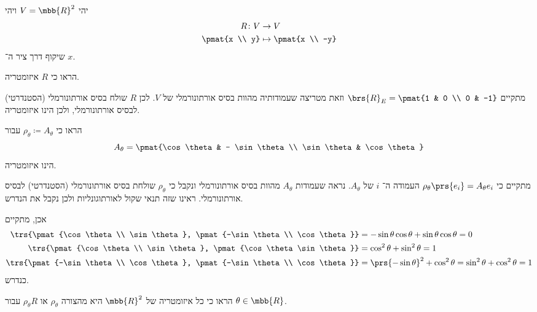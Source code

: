 \documentclass[a4paper,10pt,twoside,openany]{book}
\begin{document}
\begin{exercisechap}
יהי
$V = \mbb{R}^2$
ויהי
\begin{align*}
    R \colon V &\to V \\
    \pmat{x \\ y} &\mapsto \pmat{x \\ -y}
\end{align*}
שיקוף דרך ציר ה־%
$x$.

הראו כי
$R$
איזומטריה.
\end{exercisechap}

\begin{solution}
מתקיים
$\brs{R}_E = \pmat{1 & 0 \\ 0 & -1}$
וזאת מטריצה שעמודותיה מהוות בסיס אורתונורמלי של
$V$.
לכן
$R$
שולח בסיס אורתונורמלי (הסטנדרטי) לבסיס אורתונורמלי, ולכן הינו איזומטריה.
\end{solution}

\begin{exercisechap}
הראו כי
$\rho_\theta \coloneqq A_\theta$
עבור
\[A_\theta = \pmat{\cos \theta & - \sin \theta \\ \sin \theta & \cos\theta}\]
הינו איזומטריה.
\end{exercisechap}

\begin{solution}
מתקיים כי
$\rho_{\theta}\prs{e_i} = A_{\theta} e_i$
העמודה ה־%
$i$
של
$A_{\theta}$.
נראה שעמודות
$A_\theta$
מהוות בסיס אורתונורמלי ונקבל כי
$\rho_{\theta}$
שולחת בסיס אורתונורמלי (הסטנדרטי) לבסיס אורתונורמלי. ראינו שזה תנאי שקול לאורתוגונליות ולכן נקבל את הנדרש.

אכן, מתקיים
\begin{align*}
    \trs{\pmat{\cos \theta \\ \sin \theta}, \pmat{-\sin \theta \\ \cos \theta}} &= -\sin \theta \cos \theta + \sin \theta \cos \theta = 0 \\
    \trs{\pmat{\cos \theta \\ \sin \theta}, \pmat{\cos \theta \sin \theta}} &= \cos^2 \theta + \sin^2 \theta = 1 \\
    \trs{\pmat{-\sin \theta \\ \cos \theta}, \pmat{-\sin \theta \\ \cos \theta}} &= \prs{-\sin \theta}^2 + \cos^2 \theta = \sin^2 \theta + \cos^2 \theta = 1
\end{align*}
כנדרש.
\end{solution}

\begin{exercisechap}
הראו כי כל איזומטריה של
$\mbb{R}^2$
היא מהצורה
$\rho_\theta$
או
$\rho_\theta R$
עבור
$\theta \in \mbb{R}$.
\end{exercisechap}
\end{document}
